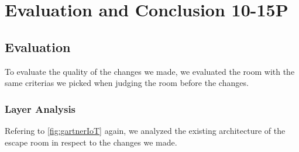 
\chapter{Evaluation and Conclusion 10-15P} %

\label{Chapter4} %

\section{Evaluation}


To evaluate the quality of the changes we made, 
we evaluated the room with the same criterias we picked when judging the room before the changes.

\subsection{Layer Analysis}
Refering to \ref{fig:gartnerIoT} again, we analyzed the existing architecture of the escape room in respect to the changes we made.
